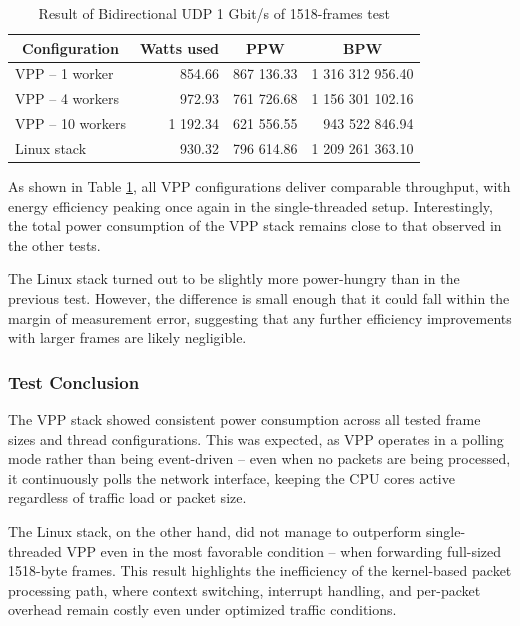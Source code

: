 \begin{table}[h!]
\centering
\begin{tabular}{|l|r|r|r|}
\hline
\multicolumn{1}{|c|}{\textbf{Configuration}} &
\multicolumn{1}{c|}{\textbf{Watts used}} &
\multicolumn{1}{c|}{\textbf{PPW}} &
\multicolumn{1}{c|}{\textbf{BPW}} \\
\hline
VPP -- 1 worker & 854.66 & 867 136.33 & 1 316 312 956.40 \\
VPP -- 4 workers & 972.93 & 761 726.68 & 1 156 301 102.16 \\
VPP -- 10 workers & 1 192.34 & 621 556.55 & 943 522 846.94 \\
Linux stack & 930.32 & 796 614.86 & 1 209 261 363.10 \\
\hline
\end{tabular}
\caption{Result of Bidirectional UDP 1 Gbit/s of 1518-frames test}
\label{tab:udp:five}
\end{table}

As shown in Table \ref{tab:udp:five}, all VPP configurations deliver comparable throughput, with energy efficiency peaking once again in the single-threaded setup. 
Interestingly, the total power consumption of the VPP stack remains close to that observed in the other tests.

The Linux stack turned out to be slightly more power-hungry than in the previous test. 
However, the difference is small enough that it could fall within the margin of measurement error, suggesting that any further efficiency improvements with larger frames are likely negligible.

\subsubsection{Test Conclusion}
The VPP stack showed consistent power consumption across all tested frame sizes and thread configurations. 
This was expected, as VPP operates in a polling mode rather than being event-driven -- even when no packets are being processed, 
it continuously polls the network interface, keeping the CPU cores active regardless of traffic load or packet size.

The Linux stack, on the other hand, did not manage to outperform single-threaded VPP even in the most favorable condition -- when forwarding full-sized 1518-byte frames. 
This result highlights the inefficiency of the kernel-based packet processing path, where context switching, interrupt handling, and per-packet overhead remain costly even under optimized traffic conditions.

